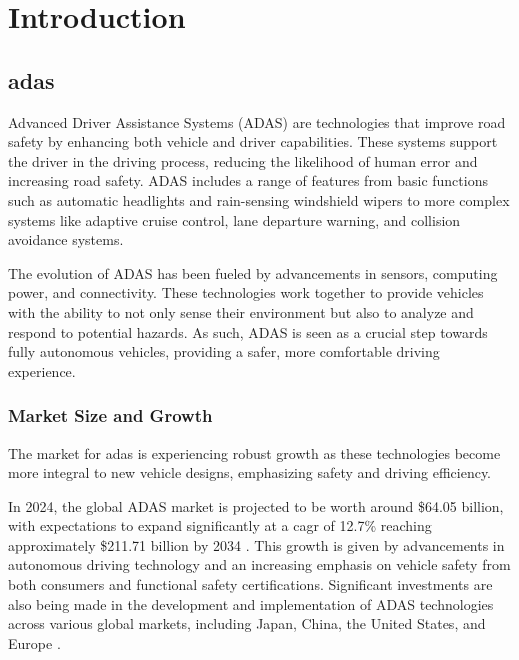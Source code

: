 \chapter{Introduction}

\section{\acl{adas}}
\label{sec:adas}
Advanced Driver Assistance Systems (ADAS) are technologies that improve road 
safety by enhancing both vehicle and driver capabilities. These systems support 
the driver in the driving process, reducing the likelihood of human error and 
increasing road safety. ADAS includes a range of features from basic functions 
such as automatic headlights and rain-sensing windshield wipers to more complex 
systems like adaptive cruise control, lane departure warning, and collision 
avoidance systems.

The evolution of ADAS has been fueled by advancements in sensors, computing 
power, and connectivity. These technologies work together to provide vehicles 
with the ability to not only sense their environment but also to analyze and 
respond to potential hazards. As such, ADAS is seen as a crucial step towards 
fully autonomous vehicles, providing a safer, more comfortable driving experience.

\subsection{Market Size and Growth}
The market for \ac{adas} is experiencing robust growth as these technologies 
become more integral to new vehicle designs, emphasizing safety and driving 
efficiency. 

In 2024, the global ADAS market is projected to be worth around 
\$64.05 billion, with expectations to expand significantly at a \ac{cagr} 
of 12.7\% reaching approximately \$211.71 billion by 2034 \cite{adas_report_2023}.
This growth is given by advancements in autonomous driving technology and 
an increasing emphasis on vehicle safety from both consumers and functional 
safety certifications. 
Significant investments are also being made in the development and 
implementation of ADAS technologies across various global markets, including 
Japan, China, the United States, and Europe \cite{adas_report_2023}.

